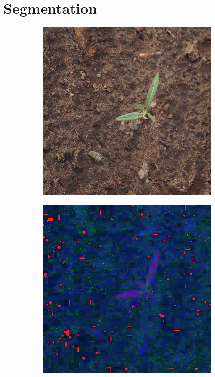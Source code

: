 \section{Segmentation}

\begin{figure}[H]
    \centering
    \captionsetup[subfigure]{justification=centering}
    \begin{subfigure}[b]{0.3\textwidth}
        \centering
        \includegraphics[width=\textwidth]{./figure/result/segmentation/imgORIGINAL.png}
		\caption{}
		\label{fig:seg_a}
    \end{subfigure}
    \begin{subfigure}[b]{0.3\textwidth}
        \centering
        \includegraphics[width=\textwidth]{./figure/result/segmentation/imgHSI.png}

\end{subfigure}
\end{figure}
